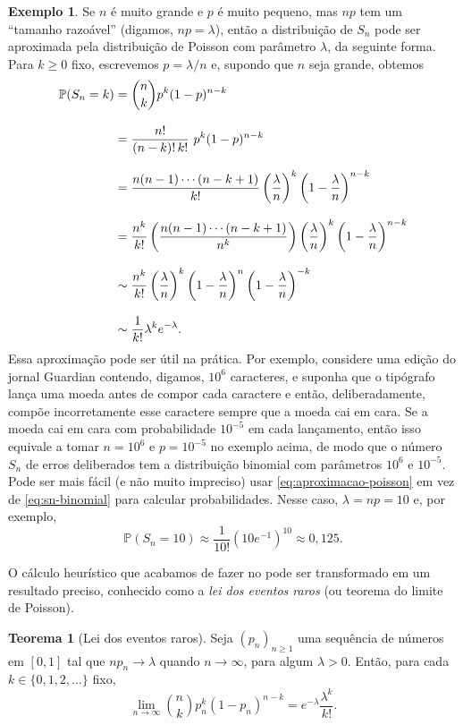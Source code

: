 \documentclass[12pt,portuguese]{article}
\let\ge\geqslant
\let\geq\geqslant
\theoremstyle{definition}
\newtheorem{theorem}{Teorema}
\newtheorem{example}[example]{Exemplo}
\begin{document}
\begin{example}
  Se \(n\) é muito grande e \(p\) é muito pequeno, mas \(np\) tem um
  ``tamanho razoável'' (digamos, \(np = \lambda\)), então a distribuição de
  \(S_n\) pode ser aproximada pela distribuição de Poisson com parâmetro
  \(\lambda\), da seguinte forma. Para \(k \geq 0\) fixo, escrevemos
  \(p = \lambda / n\) e, supondo que \(n\) seja grande, obtemos
  \begin{align}
    \mathbb{P}(S_n = k)
    &= \binom{n}{k} p^k (1-p)^{n-k}
    \notag \\[0.3cm]
    &= \frac{n!}{(n-k)!\, k!}\ p^k (1-p)^{n-k}
    \notag \\[0.3cm]
    &= \frac{n(n-1)\cdots(n-k+1)}{k!} \left(\frac{\lambda}{n}\right)^k
      \left(1 - \frac{\lambda}{n}\right)^{n-k}
    \notag \\[0.3cm]
    &= \frac{n^k}{k!} \left( \frac{n(n-1)\cdots(n-k+1)}{n^k}\right) \left(\frac{\lambda}{n}\right)^k
      \left(1 - \frac{\lambda}{n}\right)^{n-k}
    \notag \\[0.3cm]
    &\sim \frac{n^k}{k!} \left(\frac{\lambda}{n}\right)^k
      \left(1 - \frac{\lambda}{n}\right)^n
      \left(1 - \frac{\lambda}{n}\right)^{-k}
    \notag \\[0.3cm]
    &\sim \frac{1}{k!} \lambda^k e^{-\lambda}. \label{eq:aproximacao-poisson}
  \end{align}
  Essa aproximação pode ser útil na prática. Por exemplo, considere uma edição
  do jornal Guardian contendo, digamos, \(10^6\) caracteres, e suponha
  que o tipógrafo lança uma moeda antes de compor cada caractere e então,
  deliberadamente, compõe incorretamente esse caractere sempre que a moeda
  cai em cara. Se a moeda cai em cara com probabilidade \(10^{-5}\) em cada
  lançamento, então isso equivale a tomar \(n = 10^6\) e \(p = 10^{-5}\) no
  exemplo acima, de modo que o número \(S_n\) de erros deliberados tem a
  distribuição binomial com parâmetros \(10^6\) e \(10^{-5}\). Pode ser mais
  fácil (e não muito impreciso) usar \eqref{eq:aproximacao-poisson} em vez de
  \eqref{eq:sn-binomial} para calcular probabilidades. Nesse caso,
  \(\lambda = np = 10\) e, por exemplo,
  \[
    \mathbb{P}(S_n = 10) \approx \frac{1}{10!}(10e^{-1})^{10} \approx
    0{,}125.
  \]
\end{example}

O cálculo heurístico que acabamos de fazer no 
pode ser transformado em um resultado preciso, conhecido como a \emph{lei dos
eventos raros} (ou teorema do limite de Poisson).

\begin{theorem}[Lei dos eventos raros]\label{thm:lei-eventos-raros}
Seja $(p_n)_{n\ge 1}$ uma sequência de números em $[0,1]$ tal que
$n p_n \to \lambda$ quando $n\to\infty$, para algum $\lambda>0$. Então, para cada
$k\in\{0,1,2,\dots\}$ fixo,
\[
  \lim_{n\to\infty} \binom{n}{k} p_n^k (1-p_n)^{n-k}
  = e^{-\lambda}\frac{\lambda^k}{k!}.
\]
\end{theorem}
\end{document}
